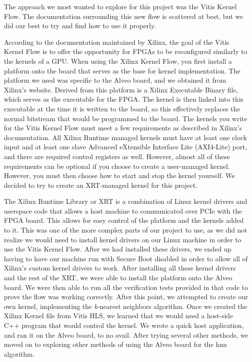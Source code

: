 \documentclass[11pt, final, conference, letterpaper, twocolumn]{IEEEtran}[2015/08/26]
\begin{document}
The approach we most wanted to explore for this project was the Vitis Kernel Flow. The documentation surrounding this new flow is scattered at best, but we did our best to try and find how to use it properly.

According to the documentation maintained by Xilinx, the goal of the Vitis Kernel Flow is to offer the opportunity for FPGAs to be reconfigured similarly to the kernels of a GPU. When using the Xilinx Kernel Flow, you first install a platform onto the board that serves as the base for kernel implementation. The platform we used was specific to the Alveo board, and we obtained it from Xilinx's website. Derived from this platform is a Xilinx Executable Binary file, which serves as the executable for the FPGA. The kernel is then linked into this executable at the time it is written to the board, so this effectively replaces the normal bitstream that would be programmed to the board. The kernels you write for the Vitis Kernel Flow must meet a few requirements as described in Xilinx's documentation. All Xilinx Runtime managed kernels must have at least one clock input and at least one slave Advanced eXtensible Interface Lite (AXI4-Lite) port, and there are required control registers as well. However, almost all of these requirements can be optional if you choose to create a user-managed kernel. However, you must then choose how to start and stop the kernel yourself. We decided to try to create an XRT-managed kernel for this project.

The Xilinx Runtime Library or XRT is a combination of Linux kernel drivers and userspace code that allows a host machine to communicated over PCIe with the FPGA board. This allows for easy control of the platform and the kernels added to it. This was one of the more complex parts of our project to use, as we did not realize we would need to install kernel drivers on our Linux machine in order to use the Vitis Kernel Flow. After we had installed these drivers, we ended up having to have our machine run with Secure Boot disabled in order to allow all of Xilinx's custom kernel drivers to work. After installing all these kernel drivers and the rest of the XRT, we were able to install the platform onto the Alveo board. We were then able to run all the verification tests provided in that code to prove the flow was working correctly. After this point, we attempted to create our own kernel, implementing the \textit{k}-nearest neighbors algorithm. Once we created the Xilinx Kernel file from Vitis HLS, we learned that we would need a host-side C++ program that would control the kernel. We wrote a quick host application, and ran it on the Alveo board, to no avail. After trying several other methods, we moved on to exploring other methods of using the Alveo board for the knn algorithm.
\end{document}
